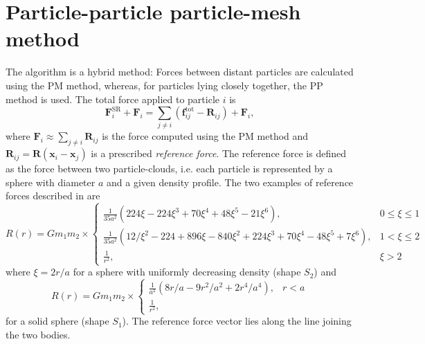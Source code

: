 \chapter{Particle-particle particle-mesh method} %
The \PThreeM{} algorithm is a hybrid method:
Forces between distant particles are calculated using the PM method, whereas, for particles lying closely together, the PP method is used.
The total force applied to particle $i$ is
\begin{equation}\label{eq:p3m}
    \mathbf{F}_i^\text{SR} + \mathbf{F}_i = \sum_{j \neq i}(\mathbf{f}_{ij}^\text{tot} - \mathbf{R}_{ij}) + \mathbf{F}_i,
\end{equation}
where $\mathbf{F}_i \approx \sum_{j\neq i} \mathbf{R}_{ij}$ is the force computed using the PM method and $\mathbf{R}_{ij} = \mathbf{R}(\mathbf{x}_i - \mathbf{x}_j)$ is a prescribed \textit{reference force}.
The reference force is defined as the force between two particle-clouds, i.e. each particle is represented by a sphere with diameter $a$ and a given density profile.
The two examples of reference forces described in \cite{Hockney1988} are
\begin{equation*}
    R(r) =
    G m_1 m_2 \times\begin{cases}
        \frac{1}{35 a^2} (224 \xi - 224 \xi^3 + 70 \xi^4 + 48 \xi^5 - 21 \xi^6),                               & 0 \leq \xi \leq 1 \\
        \frac{1}{35 a^2} (12 / \xi^2 - 224 + 896 \xi - 840 \xi^2 + 224 \xi^3 + 70 \xi^4 - 48 \xi^5 + 7 \xi^6), & 1 < \xi \leq 2    \\
        \frac{1}{r^2},                                                                                         & \xi > 2
    \end{cases}
\end{equation*}
where $\xi = 2r/a$ for a sphere with uniformly decreasing density (shape $S_2$) and
\begin{equation}\label{eq:s1-reference-force}
    R(r) =
    G m_1 m_2 \times\begin{cases}
        \frac{1}{a^2} (8 r / a - 9 r^2 / a^2 + 2 r^4 / a^4), & r < a \\
        \frac{1}{r^2},
    \end{cases}
\end{equation}
for a solid sphere (shape $S_1$).
The reference force vector lies along the line joining the two bodies.






